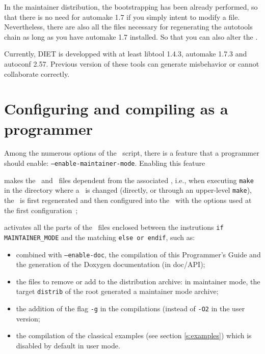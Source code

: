 \noindent
{} In the maintainer distribution, the bootstrapping has been already
performed, so that there is no need for \textsf{automake 1.7} if you simply
intent to modify a file. Nevertheless, there are also all the files necessary
for regenerating the autotools chain as long as you have \textsf{automake 1.7}
installed. So that you can also alter the \makeam.

\noindent
{} Currently, DIET is developped with at least libtool 1.4.3,
automake 1.7.3 and autoconf 2.57. Previous version of these tools can generate
misbehavior or cannot collaborate correctly.

\section{Configuring and compiling as a programmer}

Among the numerous options of the \configure\ script, there is a feature that
a programmer should enable: \texttt{--enable-maintainer-mode}. Enabling this feature
\begin{description}
\item{}makes the \make\ and \makein\ files dependent from the associated \makeam,
    i.e., when executing \texttt{make} in the directory where a \makeam\ is
    changed (directly, or through an upper-level \texttt{make}), the \makein\ is
    first regenerated and then configured into the \make\ with the options used
    at the first configuration~;
\item{}activates all the parts of the \makeam\ files enclosed between the
    instrutions \texttt{\footnotesize if MAINTAINER\_MODE} and the matching
    \texttt{\footnotesize else or endif}, such as:
    \begin{itemize}
    \item{combined with \texttt{--enable-doc}, the compilation of this
        Programmer's Guide and the generation of the Doxygen documentation (in
        doc/API);}
    \item{the files to remove or add to the distribution archive: in maintainer
        mode, the target \texttt{distrib} of the root \make generated a
        maintainer mode archive;}
    \item{the addition of the flag \texttt{-g} in the compilations (instead of
        \texttt{-O2} in the user version;}
    \item{the compilation of the classical examples (see section
        \ref{s:examples}) which is disabled by default in user mode.}
    \end{itemize}
\end{description}

